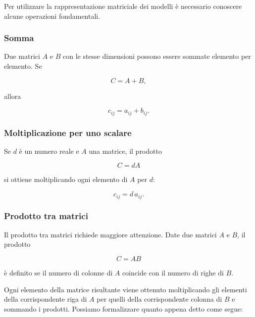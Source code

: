 Per utilizzare la rappresentazione matriciale dei modelli è
necessario conoscere alcune operazioni fondamentali.


\subsubsection{Somma}

Due matrici $A$ e $B$ con le stesse dimensioni possono essere
sommate elemento per elemento. Se

\begin{equation*}
C=A+B,
\end{equation*}

allora

\begin{equation*}
c_{ij}=a_{ij}+b_{ij}.
\end{equation*}


\subsubsection{Moltiplicazione per uno scalare}

Se $d$ è un numero reale e $A$ una matrice, il prodotto

\begin{equation*}
C=dA
\end{equation*}

si ottiene moltiplicando ogni elemento di $A$ per $d$:

\begin{equation*}
c_{ij}=d\,a_{ij}.
\end{equation*}


\subsubsection{Prodotto tra matrici}

Il prodotto tra matrici richiede maggiore attenzione. Date due
matrici $A$ e $B$, il prodotto

\begin{equation*}
C=AB
\end{equation*}

è definito se il numero di colonne di $A$ coincide con il numero
di righe di $B$.

Ogni elemento della matrice risultante viene ottenuto moltiplicando
gli elementi della corrispondente riga di $A$ per quelli della
corrispondente colonna di $B$ e sommando i prodotti. Possiamo formalizzare quanto appena detto come segue:

